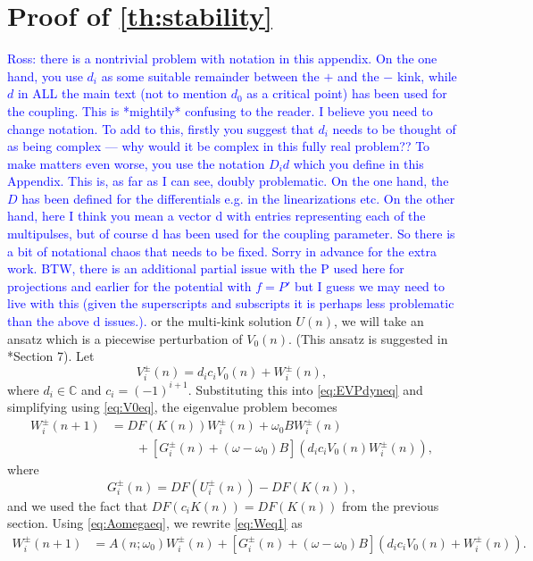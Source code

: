 \documentclass[12pt,reqno]{amsart}
\def\C{{\mathbb C}}
\newcommand{\revisedd}[2]{ \textcolor{blue}{#1} }
\begin{document}
\section{Proof of \cref{th:stability}}\label{sec:proof2}

\revisedd{Ross: there is a nontrivial problem with notation in this appendix.
On the one hand, you use $d_i$ as some suitable remainder between the
$+$ and the $-$ kink, while $d$ in ALL the main text (not to mention
$d_0$ as a critical point) has been used for the coupling. This is *mightily*
confusing to the reader. I believe you need to change notation.
To add to this, firstly you suggest that $d_i$ needs to be thought of
as being complex --- why would it be complex in this fully real problem??
To make matters even worse, you use the notation $D_i d$ which you define
in this Appendix. This is, as far as I can see, doubly problematic.
On the one hand, the $D$ has been defined for the differentials e.g.
in the linearizations etc. On the other hand, here I think you mean 
a vector d with entries representing each of the multipulses, but of
course d has been used for the coupling parameter. So there is a bit
of notational chaos that needs to be fixed. Sorry in advance for the
extra work. BTW, there is an additional partial issue with the P
used here for projections and earlier for the potential with $f=P'$
but I guess we may need to live with this (given the superscripts
and subscripts it is perhaps less problematic than the above d issues.).}

For the multi-kink solution $U(n)$, we will take an ansatz which is a piecewise perturbation of $V_0(n)$. (This ansatz is suggested in \cite{Sandstede1998}*{Section 7}). Let
\begin{equation}\label{eq:Viansatz}
V_i^\pm(n) = d_i c_i V_0(n) + W_i^\pm(n),
\end{equation}
where $d_i \in \C$ and $c_i = (-1)^{i+1}$. Substituting this into \cref{eq:EVPdyneq} and simplifying using \cref{eq:V0eq}, the eigenvalue problem becomes
\begin{equation}\label{eq:Weq1}
\begin{aligned}
W_i^\pm(n+1)
&= DF(K(n)) W_i^\pm(n) + \omega_0 B W_i^\pm(n) \\
&\qquad + [G_i^\pm(n) + (\omega - \omega_0) B](d_i c_i V_0(n) W_i^\pm(n)),
\end{aligned}
\end{equation}
where
\begin{equation}\label{eq:Gipm}
G_i^\pm(n) = DF(U_i^\pm(n)) - DF(K(n)),
\end{equation}
and we used the fact that $DF(c_i K(n)) = DF(K(n))$ from the previous section. Using \cref{eq:Aomegaeq}, we rewrite \cref{eq:Weq1} as
\begin{align}\label{eq:Weq2}
W_i^\pm(n+1)
&= A(n; \omega_0) W_i^\pm(n) + [G_i^\pm(n) + (\omega - \omega_0) B](d_i c_i V_0(n) + W_i^\pm(n)).
\end{align}
\end{document}
